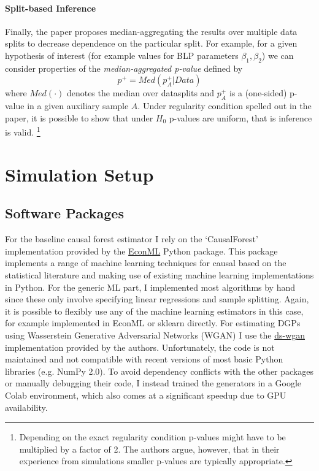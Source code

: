 \documentclass[11pt, a4paper, leqno]{article}
\begin{document}
\paragraph*{Split-based Inference}
Finally, the paper proposes median-aggregating the results over multiple data splits to decrease dependence on the particular split.
For example, for a given hypothesis of interest (for example values for BLP parameters $\beta_1, \beta_2$) we can consider properties of the \textit{median-aggregated p-value} defined by
\begin{equation*}
    p^+ = Med(p_A^+|Data)
\end{equation*}
where $Med(\cdot)$ denotes the median over datasplits and $p_A^+$ is a (one-sided) p-value in a given auxiliary sample $A$.
Under regularity condition spelled out in the paper, it is possible to show that under $H_0$ p-values are uniform, that is inference is valid.
\footnote{Depending on the exact regularity condition p-values might have to be multiplied by a factor of 2. The authors argue, however, that in their experience from simulations smaller p-values are typically appropriate.}
\section{Simulation Setup}

\subsection{Software Packages}
For the baseline causal forest estimator I rely on the `CausalForest' implementation provided by the \href{https://econml.azurewebsites.net/}{EconML} Python package.
This package implements a range of machine learning techniques for causal based on the statistical literature and making use of existing machine learning implementations in Python.
For the generic ML part, I implemented most algorithms by hand since these only involve specifying linear regressions and sample splitting.
Again, it is possible to flexibly use any of the machine learning estimators in this case, for example implemented in EconML or sklearn directly.
For estimating DGPs using Wasserstein Generative Adversarial Networks (WGAN) I use the \href{https://github.com/gsbDBI/ds-wgan}{ds-wgan} implementation provided by the authors.
Unfortunately, the code is not maintained and not compatible with recent versions of most basic Python libraries (e.g. NumPy 2.0).
To avoid dependency conflicts with the other packages or manually debugging their code, I instead trained the generators in a Google Colab environment, which also comes at a significant speedup due to GPU availability.
\end{document}
